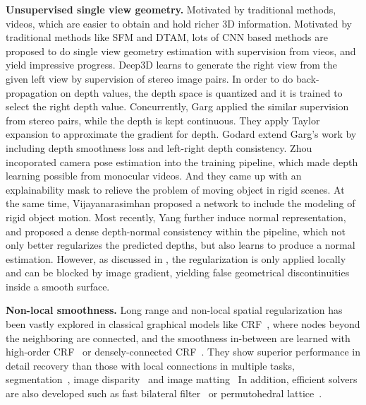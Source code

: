 \textbf{Unsupervised single view geometry.}
Motivated by traditional methods, videos, which are easier to obtain and hold richer 3D information. Motivated by traditional methods like SFM and DTAM, lots of CNN based methods are proposed to do single view geometry estimation with supervision from vieos, and yield impressive progress. 
 Deep3D \cite{xie2016deep3d} learns to generate the right view from the given left view by supervision of stereo image pairs. In order to do back-propagation on depth values, the depth space is quantized and it is trained to select the right depth value. 
Concurrently, Garg \etal \cite{GargBR16} applied the similar supervision from stereo pairs, while the depth is kept continuous. They apply Taylor expansion to approximate the gradient for depth. Godard \etal \cite{godard2016unsupervised} extend Garg's work by including depth smoothness loss and left-right depth consistency. 
Zhou \etal \cite{zhou2017unsupervised} incoporated camera pose estimation into the training pipeline, which made depth learning possible from monocular videos. And they came up with an explainability mask to relieve the problem of moving object in rigid scenes.
At the same time, Vijayanarasimhan \etal \cite{Vijayanarasimhan17} proposed a network to include the modeling of rigid object motion. Most recently, Yang \etal \cite{yang2018aaai} further induce normal representation, and proposed a dense depth-normal consistency within the pipeline, which not only better regularizes the predicted depths, but also learns to produce a normal estimation. However, as discussed in , the regularization is only applied locally and can be blocked by image gradient, yielding false geometrical discontinuities inside a smooth surface.

\textbf{Non-local smoothness.} Long range and non-local spatial regularization has been vastly explored in classical graphical models like CRF~\cite{lafferty2001conditional}, where nodes beyond the neighboring are connected, and the smoothness in-between are learned with high-order CRF~\cite{ye2009conditional} or densely-connected CRF~\cite{DBLP:conf/icml/KraehenbuehlK13}. They show superior performance in detail recovery than those with local connections in multiple tasks, \eg segmentation~\cite{DBLP:journals/corr/abs-1210-5644}, image disparity~\cite{scharstein2007learning} and image matting~\cite{chen2013image} \etc In addition, efficient solvers are also developed such as fast bilateral filter~\cite{barron2016fast} or permutohedral lattice~\cite{adams2010fast}. 

